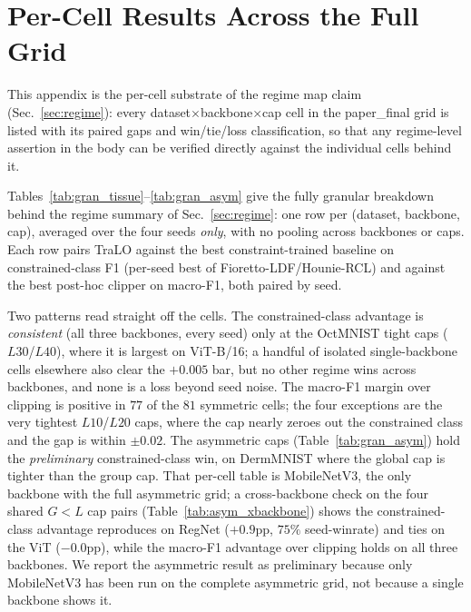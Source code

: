 \documentclass[10pt]{article}
\begin{document}
\section{Per-Cell Results Across the Full Grid}
\label{app:regime}

This appendix is the per-cell substrate of the regime map claim
(Sec.~\ref{sec:regime}): every dataset$\times$backbone$\times$cap cell in
the paper\_final grid is listed with its paired gaps and win/tie/loss
classification, so that any regime-level assertion in the body can be
verified directly against the individual cells behind it.

Tables~\ref{tab:gran_tissue}--\ref{tab:gran_asym} give the fully granular
breakdown behind the regime summary of Sec.~\ref{sec:regime}: one row
per (dataset, backbone, cap), averaged over the four seeds \emph{only},
with no pooling across backbones or caps. Each row pairs TraLO against
the best constraint-trained baseline on constrained-class F1 (per-seed
best of Fioretto-LDF/Hounie-RCL) and against the best post-hoc clipper
on macro-F1, both paired by seed.

Two patterns read straight off the cells. The constrained-class
advantage is \emph{consistent} (all three backbones, every seed) only
at the OctMNIST tight caps ($L30$/$L40$), where it is largest on
ViT-B/16; a handful of isolated single-backbone cells elsewhere also
clear the $+0.005$ bar, but no other regime wins across backbones, and
none is a loss beyond seed noise. The macro-F1 margin over clipping is
positive in $77$ of the $81$ symmetric cells; the four exceptions are
the very tightest $L10$/$L20$ caps, where the cap nearly zeroes out the
constrained class and the gap is within $\pm0.02$. The asymmetric caps
(Table~\ref{tab:gran_asym}) hold the \emph{preliminary}
constrained-class win, on DermMNIST where the global cap is tighter
than the group cap. That per-cell table is MobileNetV3, the only
backbone with the full asymmetric grid; a cross-backbone check on the
four shared $G{<}L$ cap pairs (Table~\ref{tab:asym_xbackbone}) shows
the constrained-class advantage reproduces on RegNet ($+0.9$pp, $75\%$
seed-winrate) and ties on the ViT ($-0.0$pp), while the macro-F1
advantage over clipping holds on all three backbones. We report the
asymmetric result as preliminary because only MobileNetV3 has been run
on the complete asymmetric grid, not because a single backbone shows it.
\end{document}
